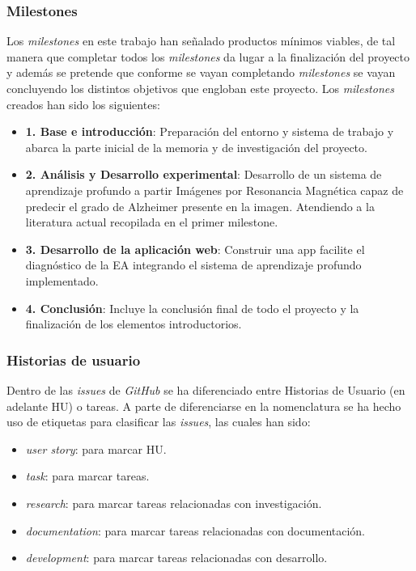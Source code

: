 \subsubsection{Milestones}
Los \textit{milestones} en este trabajo han señalado productos mínimos viables, de tal manera que completar todos los
\textit{milestones} da lugar a la finalización del proyecto y además se pretende que conforme se vayan completando
\textit{milestones} se vayan concluyendo los distintos objetivos que engloban este proyecto.
Los \textit{milestones} creados han sido los siguientes:
\begin{itemize}
    \item  \textbf{1. Base e introducción}: Preparación del entorno y sistema de trabajo y abarca la parte inicial de la
    memoria y de investigación del proyecto.
    \item \textbf{2. Análisis y Desarrollo experimental}: Desarrollo de un sistema de aprendizaje profundo a partir
    Imágenes por Resonancia Magnética capaz de predecir el grado de Alzheimer presente en la imagen.
    Atendiendo a la literatura actual recopilada en el primer milestone.
    \item \textbf{3. Desarrollo de la aplicación web}: Construir una app facilite  el diagnóstico de la EA integrando el
    sistema de aprendizaje profundo implementado.
    \item \textbf{4. Conclusión}: Incluye la conclusión final de todo el proyecto y la finalización de los elementos
    introductorios.\\
\end{itemize}

\subsubsection{Historias de usuario}
Dentro de las \textit{issues} de \textit{GitHub} se ha diferenciado entre Historias de Usuario (en adelante \Gls{HU}) o
tareas.
A parte de diferenciarse en la nomenclatura se ha hecho uso de etiquetas para clasificar las \textit{issues}, las cuales
han sido:

\begin{itemize}
    \item \textit{user story}: para marcar HU.
    \item \textit{task}: para marcar tareas.
    \item \textit{research}: para marcar tareas relacionadas con investigación.
    \item \textit{documentation}: para marcar tareas relacionadas con documentación.
    \item \textit{development}: para marcar tareas relacionadas con desarrollo. \\
\end{itemize}

